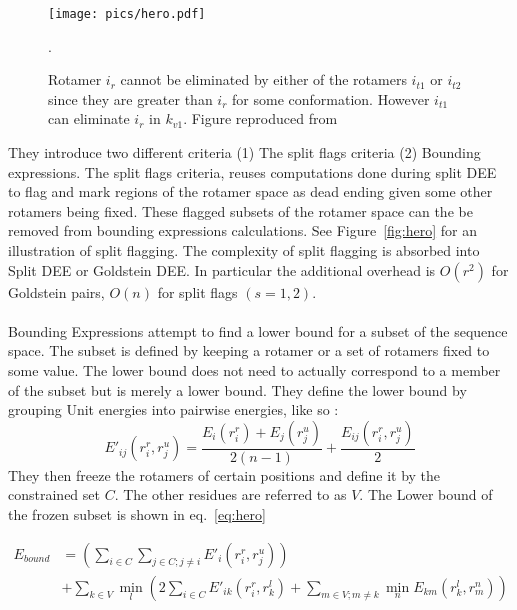 \documentclass{article}
\begin{document}
\begin{figure}[h!]
    \centering
    \texttt{[image: pics/hero.pdf]}
    \caption{Rotamer $i_r$ cannot be eliminated by either of the rotamers $i_{t1}$ or $i_{t2}$ since they are greater than $i_r$ for some conformation. However $i_{t1}$ can eliminate $i_r$ in $k_{v1}$. Figure reproduced from~\cite{Gordon2003}}.
    \label{fig:ero}
\end{figure}

They introduce two different criteria (1) The split flags criteria (2) Bounding expressions. The split flags criteria, reuses computations done during split DEE to flag and mark regions of the rotamer space as dead ending given some other rotamers being fixed. These flagged subsets of the rotamer space can the be removed from bounding expressions calculations. See Figure~\ref{fig:hero} for an illustration of split flagging. The complexity of split flagging is absorbed into Split DEE or Goldstein DEE. In particular the additional overhead is $O(r^2)$ for Goldstein pairs, $O(n)$ for split flags $(s=1,2)$. 
\\
\\
Bounding Expressions attempt to find a lower bound for a subset of the sequence space. The subset is defined by keeping a rotamer or a set of rotamers fixed to some value. The lower bound does not need to actually correspond to a member of the subset but is merely a lower bound. They define the lower bound by grouping Unit energies into pairwise energies, like so : 
\[
	E'_{ij}(r_i^r,r_j^u) = \frac{E_i(r_i^r)+E_j(r_j^u)}{2(n-1)} + \frac{E_{ij}(r_i^r,r_j^u)}{2}
\]
They then freeze the rotamers of certain positions and define it by the constrained set $C$. The other residues are referred to as $V$. The Lower bound of the frozen subset is shown in eq.~\ref{eq:hero}

\begin{equation}
\label{eq:hero}
\begin{split}
E_{bound} &= \left( \sum_{i\in C} \sum_{j\in C; j\neq i}E'_i(r_i^r,r_j^u) \right) \\ &+ 
		\sum_{k\in V}\min_l \left( 2\sum_{i \in C}E'_{ik}(r_i^r,r_k^l) + \sum_{m\in V; m\neq k}\min_n E_{km}(r_k^l,r_m^n) \right) 
\end{split}
\end{equation}
\end{document}
